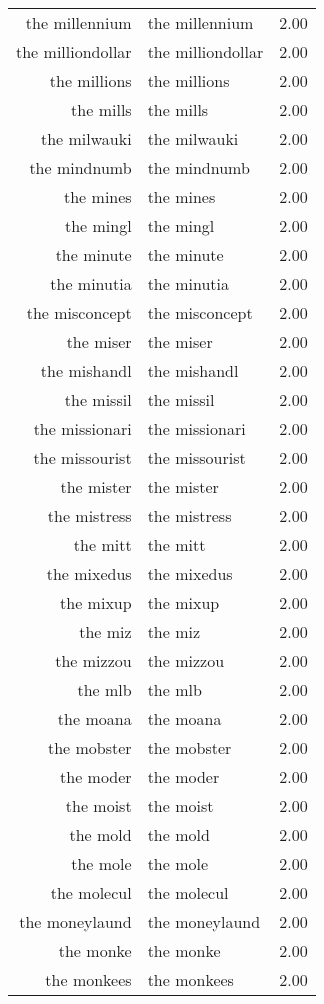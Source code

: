\begin{table}[ht]
\begin{tabular}{rlr}
  the millennium & the millennium & 2.00 \\ 
  the milliondollar & the milliondollar & 2.00 \\ 
  the millions & the millions & 2.00 \\ 
  the mills & the mills & 2.00 \\ 
  the milwauki & the milwauki & 2.00 \\ 
  the mindnumb & the mindnumb & 2.00 \\ 
  the mines & the mines & 2.00 \\ 
  the mingl & the mingl & 2.00 \\ 
  the minute & the minute & 2.00 \\ 
  the minutia & the minutia & 2.00 \\ 
  the misconcept & the misconcept & 2.00 \\ 
  the miser & the miser & 2.00 \\ 
  the mishandl & the mishandl & 2.00 \\ 
  the missil & the missil & 2.00 \\ 
  the missionari & the missionari & 2.00 \\ 
  the missourist & the missourist & 2.00 \\ 
  the mister & the mister & 2.00 \\ 
  the mistress & the mistress & 2.00 \\ 
  the mitt & the mitt & 2.00 \\ 
  the mixedus & the mixedus & 2.00 \\ 
  the mixup & the mixup & 2.00 \\ 
  the miz & the miz & 2.00 \\ 
  the mizzou & the mizzou & 2.00 \\ 
  the mlb & the mlb & 2.00 \\ 
  the moana & the moana & 2.00 \\ 
  the mobster & the mobster & 2.00 \\ 
  the moder & the moder & 2.00 \\ 
  the moist & the moist & 2.00 \\ 
  the mold & the mold & 2.00 \\ 
  the mole & the mole & 2.00 \\ 
  the molecul & the molecul & 2.00 \\ 
  the moneylaund & the moneylaund & 2.00 \\ 
  the monke & the monke & 2.00 \\ 
  the monkees & the monkees & 2.00 \\ 

\end{tabular}
\end{table}

